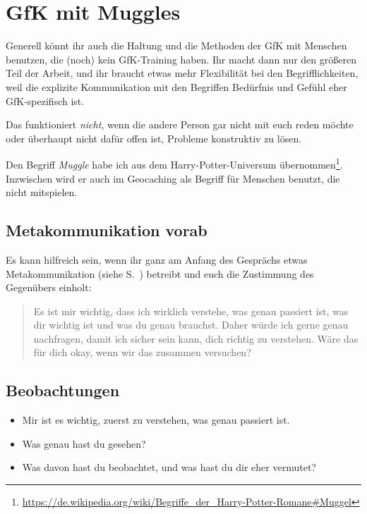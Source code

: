 \section{GfK mit Muggles}
\label{gfk-mit-muggles}

Generell könnt ihr auch die Haltung und die Methoden der GfK mit Menschen benutzen, die (noch) kein GfK-Training haben. Ihr macht dann nur den größeren Teil der Arbeit, und ihr braucht etwas mehr Flexibilität bei den Begrifflichkeiten, weil die explizite Kommunikation mit den Begriffen \glqq Bedürfnis\glqq{} und \grqq Gefühl\glqq{} eher GfK-spezifisch ist.

Das funktioniert \emph{nicht}, wenn die andere Person gar nicht mit euch reden möchte oder überhaupt nicht dafür offen ist, Probleme konstruktiv zu lösen.

Den Begriff \emph{Muggle} habe ich aus dem Harry-Potter-Universum übernommen\footnote{\url{https://de.wikipedia.org/wiki/Begriffe_der_Harry-Potter-Romane\#Muggel}}. Inzwischen wird er auch im Geocaching als Begriff für Menschen benutzt, die nicht mitspielen.


\subsection{Metakommunikation vorab}

Es kann hilfreich sein, wenn ihr ganz am Anfang des Gesprächs etwas Metakommunikation (siehe S.~\pageref{metakommunikation}) betreibt und euch die Zustimmung des Gegenübers einholt:

\begin{quote}
  Es ist mir wichtig, dass ich wirklich verstehe, was genau passiert ist, was dir wichtig ist und was du genau brauchst. Daher würde ich gerne genau nachfragen, damit ich sicher sein kann, dich richtig zu verstehen. Wäre das für dich okay, wenn wir das zusammen versuchen?
\end{quote}


\subsection{Beobachtungen}

\begin{itemize}
  \item Mir ist es wichtig, zuerst zu verstehen, was genau passiert ist.
  \item Was genau hast du gesehen?
  \item Was davon hast du beobachtet, und was hast du dir eher vermutet?
\end{itemize}


